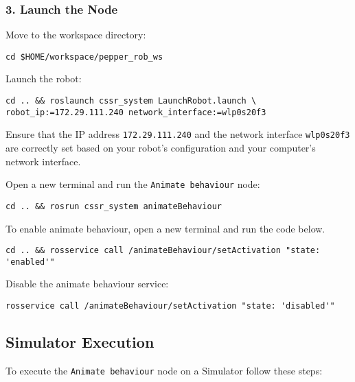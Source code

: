 \documentclass{CSSRforAfrica}
\begin{document}
\subsubsection*{3. Launch the Node}
Move to the workspace directory:\\
\begin{lstlisting}[style=linuxbashstyle]
cd $HOME/workspace/pepper_rob_ws
\end{lstlisting}
Launch the robot:\\
\begin{lstlisting}[style=linuxbashstyle]
cd .. && roslaunch cssr_system LaunchRobot.launch \
robot_ip:=172.29.111.240 network_interface:=wlp0s20f3
\end{lstlisting}
\begin{tcolorbox}[colback=yellow!20,colframe=yellow!50!black,title=NOTE]
Ensure that the IP address \texttt{172.29.111.240} and the network interface \texttt{wlp0s20f3} are correctly set based on your robot's configuration and your computer's network interface.
\end{tcolorbox}
Open a new terminal and run the \texttt{Animate behaviour} node:\\
\begin{lstlisting}[style=linuxbashstyle]
cd .. && rosrun cssr_system animateBehaviour
\end{lstlisting}
To enable animate behaviour, open a new terminal and run the code below.\\
\begin{lstlisting}[style=linuxbashstyle]
cd .. && rosservice call /animateBehaviour/setActivation "state: 'enabled'"
\end{lstlisting}
Disable the animate behaviour service:\\
\begin{lstlisting}[style=linuxbashstyle]
rosservice call /animateBehaviour/setActivation "state: 'disabled'"
\end{lstlisting}


\subsection{Simulator Execution}
To execute the \texttt{Animate behaviour} node on a Simulator follow these steps:
\end{document}
